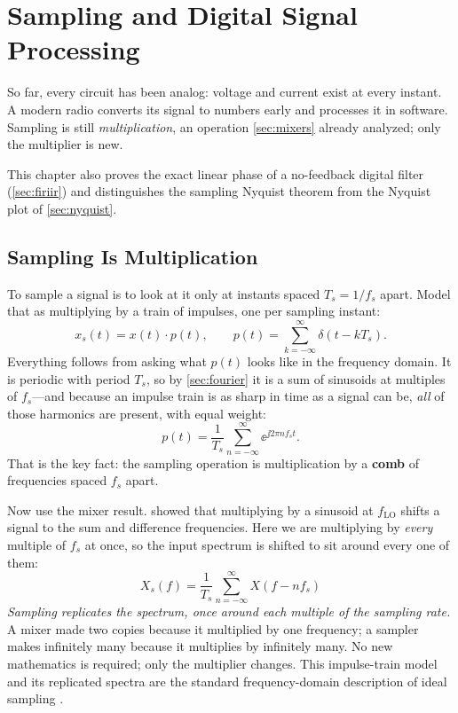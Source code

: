 \chapter{Sampling and Digital Signal Processing}
\label{ch:dsp}
So far, every circuit has been analog: voltage and current exist at every instant.
A modern radio converts its signal to numbers early and processes it in software.
Sampling is still \emph{multiplication}, an operation \cref{sec:mixers} already
analyzed; only the multiplier is new.

This chapter also proves the exact linear phase of a no-feedback digital filter
(\cref{sec:firiir}) and distinguishes the sampling Nyquist theorem from the
Nyquist plot of \cref{sec:nyquist}.

\section{Sampling Is Multiplication}
\label{sec:samplingismult}
To sample a signal is to look at it only at instants spaced \(T_s=1/f_s\) apart. Model
that as multiplying by a train of impulses, one per sampling instant:
\[
x_s(t)=x(t)\cdot p(t),
\qquad
p(t)=\sum_{k=-\infty}^{\infty}\delta(t-kT_s).
\]
Everything follows from asking what \(p(t)\) looks like in the frequency domain. It is
periodic with period \(T_s\), so by \cref{sec:fourier} it is a sum of sinusoids at
multiples of \(f_s\)---and because an impulse train is as sharp in time as a signal can
be, \emph{all} of those harmonics are present, with equal weight:
\[
p(t)=\frac{1}{T_s}\sum_{n=-\infty}^{\infty}\ee^{\jj 2\pi n f_s t}.
\]
That is the key fact: the sampling operation is multiplication by a
\textbf{comb} of frequencies spaced \(f_s\) apart.

Now use the mixer result.  showed that multiplying by a sinusoid at
\(f_{\mathrm{LO}}\) shifts a signal to the sum and difference frequencies. Here we are
multiplying by \emph{every} multiple of \(f_s\) at once, so the input spectrum is
shifted to sit around every one of them:
\[
\boxed{\;
X_s(f)=\frac{1}{T_s}\sum_{n=-\infty}^{\infty}X(f-nf_s)\;}
\]
\emph{Sampling replicates the spectrum, once around each multiple of the sampling
rate.} A mixer made two copies because it multiplied by one frequency; a sampler makes
infinitely many because it multiplies by infinitely many. No new mathematics is
required; only the multiplier changes.
This impulse-train model and its replicated spectra are the standard frequency-domain
description of ideal sampling \cite[pp.~23--25]{giannini2008baseband}.

